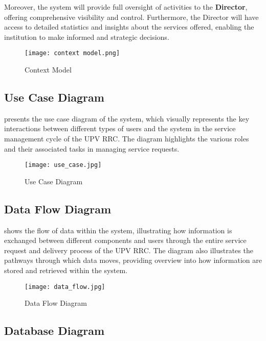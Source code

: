 Moreover, the system will provide full oversight of activities to the \textbf{Director}, offering comprehensive visibility and control. Furthermore, the Director will have access to detailed statistics and insights about the services offered, enabling the institution to make informed and strategic decisions.

\begin{figure}[h]
	\centering 
	\texttt{[image: context model.png]}
	\caption{Context Model}
	\label{fig:context_model}
\end{figure}

\newpage

\subsection{Use Case Diagram}

 presents the use case diagram of the system, which visually represents the key interactions between different types of users and the system in the service management cycle of the UPV RRC. The diagram highlights the various roles and their associated tasks in managing service requests.

\begin{figure}[h]
	\centering 
	\texttt{[image: use\_case.jpg]}
	\caption{Use Case Diagram}
	\label{fig:use_case}
\end{figure}

\newpage

\subsection{Data Flow Diagram}

 shows the flow of data within the system, illustrating how information is exchanged between different components and users through the entire service request and delivery process of the UPV RRC. The diagram also illustrates the pathways through which data moves, providing overview into how information are stored and retrieved within the system.

\begin{figure}[h]
	\centering 
	\texttt{[image: data\_flow.jpg]}
	\caption{Data Flow Diagram}
	\label{fig:data_flow}
\end{figure}

\newpage

\subsection{Database Diagram}

